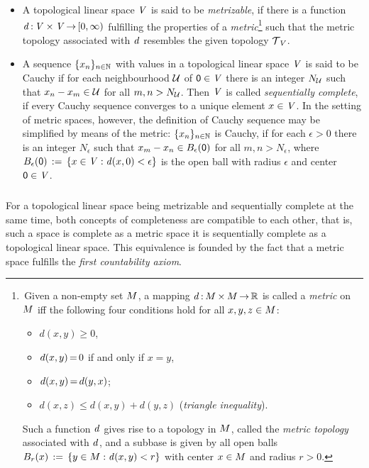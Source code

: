 \documentclass[11pt,twoside]{article}
\begin{document}
\begin{itemize}[leftmargin=15pt,itemsep=3pt]
\item[1.]
A topological linear space $\mathit{V}$ is said to be \textit{metrizable},
if there is a function
$\mathit{d}{\,:\,}\mathit{V} \times \mathit{V} {\,\to\,} [0,\infty)$
fulfilling the properties of a \textit{metric}\footnote{
\,Given a non-empty set $M$,
a mapping $\mathit{d}{\,:\,}M {\,\times\,} M {\,\to\,} {\mathbb{R}}$ is called a \textit{metric}
on $M$
iff the following four conditions hold for all $x,y,z \in M$:
\begin{itemize}[leftmargin=40pt,itemsep=0pt]
\item[(M-1)]
$d(x,y) \geq 0$,
\item[(M-2)]
$d(x,y) {\,=\,} 0$ if and only if $x=y$,
\item[(M-3)]
$d(x,y) {\,=\,} d(y,x)$;
\item[(M-4)]
$d(x,z) \leq d(x,y) + d(y,z)$ \hspace{3mm}(\textit{triangle inequality}).
\end{itemize}
Such a function $\mathit{d}$ gives rise to a topology in $M$,
called the \textit{metric topology} associated with $\mathit{d}$,
and a subbase is given by all open balls
$B_r(x) \,:=\, \{y \in M: \mathit{d}(x,y) < r\}$
with center $x \in M$ and radius $r > 0$.
}
such that the metric topology associated with $\mathit{d}$
resembles the given topology $\mathcal{T}_{\,\mathit{V}}$.

\item[2.]
A sequence $\{x_n\}_{n \in {\mathbb{N}}}$ with values
in a topological linear space $\mathit{V}$ is said to be Cauchy
if for each neighbourhood $\mathcal{U}$ of ${\mathsf{0}} \in \mathit{V}$
there is an integer $N_{\mathcal{U}}$
such that $x_n - x_m \in \mathcal{U}$ for all $m,n > N_{\mathcal{U}}$.
Then $\mathit{V}$ is called \textit{sequentially complete},
if every Cauchy sequence converges to a unique element $x \in \mathit{V}$.
In the setting of metric spaces,
however,
the definition of Cauchy sequence may be simplified by means of the metric:
$\{x_n\}_{n \in {\mathbb{N}}}$ is Cauchy,
if for each $\epsilon > 0$ there is an integer $N_{\epsilon}$ 
such that
$x_m - x_n \in B_{\epsilon}({\mathsf{0}})$ for all $m,n > N_{\epsilon}$,
where $B_{\epsilon}({\mathsf{0}}) \,:=\, \{x \in \mathit{V}: \mathit{d}(x,0) < \epsilon\}$
is the open ball with radius $\epsilon$ and center ${\mathsf{0}} \in \mathit{V}$.
\end{itemize}

\subparagraph*{}
For a topological linear space being metrizable and sequentially complete
at the same time,
both concepts of completeness are compatible to each other,
that is,
such a space is complete as a metric space
\iff
it is sequentially complete as a topological linear space.
This equivalence is founded by the fact
that a metric space fulfills the \textit{first countability axiom}.
\end{document}

